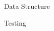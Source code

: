 \documentclass{article}
\begin{document}
\begin{mylist}
\begin{center}
\end{center}

\restoregeometry
\newpage
\item Data Structure

\item Testing

\end{mylist}
\end{document}
